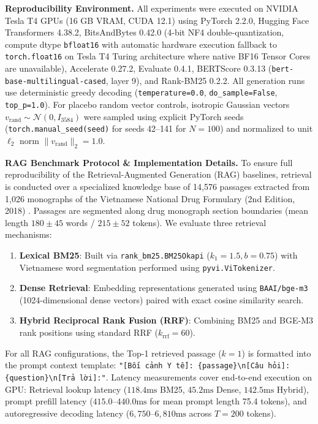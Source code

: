 \textbf{Reproducibility Environment.} All experiments were executed on NVIDIA Tesla T4 GPUs (16 GB VRAM, CUDA 12.1) using PyTorch 2.2.0, Hugging Face Transformers 4.38.2, BitsAndBytes 0.42.0 (4-bit NF4 double-quantization, compute dtype \texttt{bfloat16} with automatic hardware execution fallback to \texttt{torch.float16} on Tesla T4 Turing architecture where native BF16 Tensor Cores are unavailable), Accelerate 0.27.2, Evaluate 0.4.1, BERTScore 0.3.13 (\texttt{bert-base-multilingual-cased}, layer 9), and Rank-BM25 0.2.2. All generation runs use deterministic greedy decoding (\texttt{temperature=0.0}, \texttt{do\_sample=False}, \texttt{top\_p=1.0}). For placebo random vector controls, isotropic Gaussian vectors $v_{\text{rand}} \sim \mathcal{N}(0, I_{3584})$ were sampled using explicit PyTorch seeds (\texttt{torch.manual\_seed(seed)} for seeds 42--141 for $N=100$) and normalized to unit $\ell_2$ norm $\|v_{\text{rand}}\|_2 = 1.0$.

\textbf{RAG Benchmark Protocol \& Implementation Details.} To ensure full reproducibility of the Retrieval-Augmented Generation (RAG) baselines, retrieval is conducted over a specialized knowledge base of 14,576 passages extracted from 1,026 monographs of the Vietnamese National Drug Formulary (2nd Edition, 2018) \cite{ref6}. Passages are segmented along drug monograph section boundaries (mean length $180 \pm 45$ words / $215 \pm 52$ tokens). We evaluate three retrieval mechanisms:
\begin{enumerate}
    \item \textbf{Lexical BM25}: Built via \texttt{rank\_bm25.BM25Okapi} ($k_1=1.5, b=0.75$) with Vietnamese word segmentation performed using \texttt{pyvi.ViTokenizer}.
    \item \textbf{Dense Retrieval}: Embedding representations generated using \texttt{BAAI/bge-m3} (1024-dimensional dense vectors) paired with exact cosine similarity search.
    \item \textbf{Hybrid Reciprocal Rank Fusion (RRF)}: Combining BM25 and BGE-M3 rank positions using standard RRF ($k_{\text{rrf}}=60$).
\end{enumerate}
For all RAG configurations, the Top-1 retrieved passage ($k=1$) is formatted into the prompt context template: \texttt{"[Bối cảnh Y tế]: \{passage\}\textbackslash n[Câu hỏi]: \{question\}\textbackslash n[Trả lời]:"}. Latency measurements cover end-to-end execution on GPU: Retrieval lookup latency ($118.4\text{ms}$ BM25, $45.2\text{ms}$ Dense, $142.5\text{ms}$ Hybrid), prompt prefill latency ($415.0\text{--}440.0\text{ms}$ for mean prompt length 75.4 tokens), and autoregressive decoding latency ($6,750\text{--}6,810\text{ms}$ across $T=200$ tokens).

